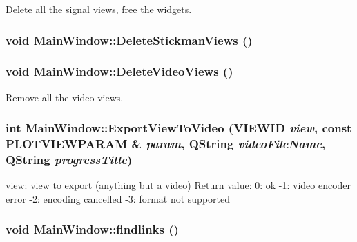 Delete all the signal views, free the widgets. 

\hypertarget{class_main_window_78b58b233232182d665630724c389722}{
\subsubsection[{DeleteStickmanViews}]{\setlength{\rightskip}{0pt plus 5cm}void MainWindow::DeleteStickmanViews ()}}
\label{class_main_window_78b58b233232182d665630724c389722}


\hypertarget{class_main_window_2bf9d66369a40ff29079f0f0e3f70f4f}{
\subsubsection[{DeleteVideoViews}]{\setlength{\rightskip}{0pt plus 5cm}void MainWindow::DeleteVideoViews ()}}
\label{class_main_window_2bf9d66369a40ff29079f0f0e3f70f4f}


Remove all the video views. 

\hypertarget{class_main_window_62c631b1db13fcd6377fda76a5b18585}{
\subsubsection[{ExportViewToVideo}]{\setlength{\rightskip}{0pt plus 5cm}int MainWindow::ExportViewToVideo ({\bf VIEWID} {\em view}, \/  const {\bf PLOTVIEWPARAM} \& {\em param}, \/  QString {\em videoFileName}, \/  QString {\em progressTitle})}}
\label{class_main_window_62c631b1db13fcd6377fda76a5b18585}


view: view to export (anything but a video) Return value: 0: ok -1: video encoder error -2: encoding cancelled -3: format not supported \hypertarget{class_main_window_f6b2dd694749387c22e02c807e2f34c7}{
\subsubsection[{findlinks}]{\setlength{\rightskip}{0pt plus 5cm}void MainWindow::findlinks ()}}
\label{class_main_window_f6b2dd694749387c22e02c807e2f34c7}


